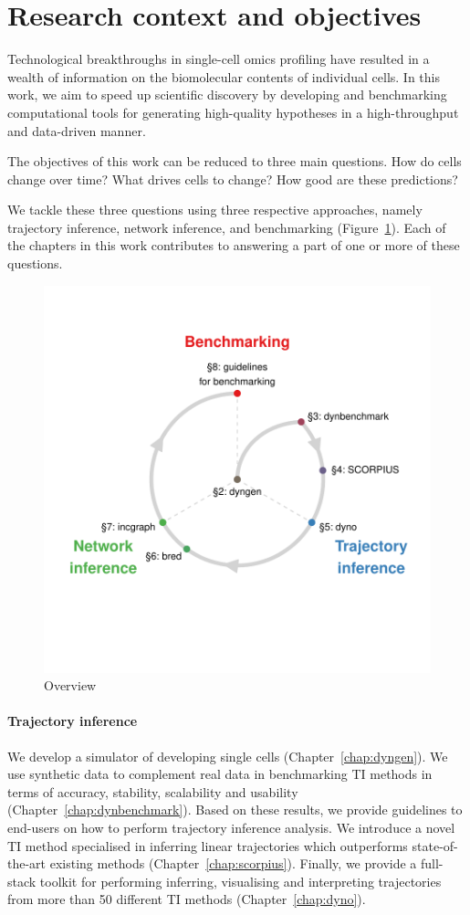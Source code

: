 \section{Research context and objectives} \label{sec:research_objectives}
Technological breakthroughs in single-cell omics profiling have resulted in a wealth of information on the biomolecular contents of individual cells. In this work, we aim to speed up scientific discovery by developing and benchmarking computational tools for generating high-quality hypotheses in a high-throughput and data-driven manner.

The objectives of this work can be reduced to three main questions. How do cells change over time? What drives cells to change? How good are these predictions?

We tackle these three questions using three respective approaches, namely trajectory inference, network inference, and benchmarking (Figure~\ref{fig:overview_thesis}). Each of the chapters in this work contributes to answering a part of one or more of these questions.

\begin{figure}[htb!]
	\centering
	\includegraphics[width=.75\linewidth]{fig/overview.pdf}
	\caption{Overview}
	\label{fig:overview_thesis}
\end{figure}

\paragraph{Trajectory inference} We develop a simulator of developing single cells (Chapter~\ref{chap:dyngen}). We use synthetic data to complement real data in benchmarking TI methods in terms of accuracy, stability, scalability and usability (Chapter~\ref{chap:dynbenchmark}). Based on these results, we provide guidelines to end-users on how to perform trajectory inference analysis. We introduce a novel TI method specialised in inferring linear trajectories which outperforms state-of-the-art existing methods (Chapter~\ref{chap:scorpius}). Finally, we provide a full-stack toolkit for performing inferring, visualising and interpreting trajectories from more than 50 different TI methods (Chapter~\ref{chap:dyno}).


